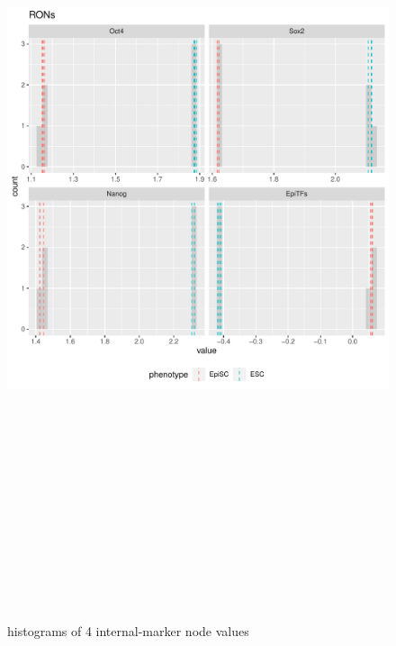\documentclass[
]{book}
\begin{document}
\begin{figure}[H]

{\centering \includegraphics[width=460pt,height=700pt]{ipsc/results/original-experimental_internalmarkers} 

}

\caption{histograms of 4 internal-marker node values}\label{fig:unnamed-chunk-28}
\end{figure}
\end{document}
